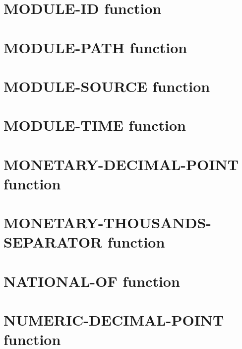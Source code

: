
\section{MODULE-ID function}


\section{MODULE-PATH function}


\section{MODULE-SOURCE function}


\section{MODULE-TIME function}


\section{MONETARY-DECIMAL-POINT function}


\section{MONETARY-THOUSANDS-SEPARATOR function}


\section{NATIONAL-OF function}


\section{NUMERIC-DECIMAL-POINT function}

